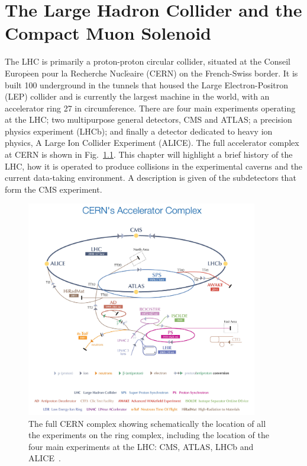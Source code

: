 \chapter{The Large Hadron Collider and the Compact Muon Solenoid}
\label{ch:LHCCMS}

The LHC is primarily a proton-proton circular collider, situated at the Conseil Europ$\acute{\text{e}}$en pour la Recherche Nucl$\acute{\text{e}}$aire (CERN) on the French-Swiss border. 
It is built 100\m{} underground in the tunnels that housed the Large Electron-Positron (LEP) collider and is currently the largest machine in the world, with an accelerator ring 27\km{} in circumference. 
There are four main experiments operating at the LHC; two multipurpose general detectors, CMS and ATLAS; a precision \bquark{} physics experiment (LHCb); and finally a detector dedicated to heavy ion physics, A Large Ion Collider Experiment (ALICE). 
The full accelerator complex at CERN is shown in Fig.~\ref{fig:CERNcomplex}.
This chapter will highlight a brief history of the LHC, how it is operated to produce collisions in the experimental caverns and the current data-taking environment.
A description is given of the subdetectors that form the CMS experiment.
\begin{figure}[htpb]
	\centering
	\includegraphics[width=0.9\textwidth]{Figures/CERNcomplex}
	\caption[The full CERN complex showing schematically the location of all the experiments on the ring complex, including the location of the four main experiments at the LHC: CMS, ATLAS, LHCb and ALICE.]{The full CERN complex showing schematically the location of all the experiments on the ring complex, including the location of the four main experiments at the LHC: CMS, ATLAS, LHCb and ALICE~\cite{CERNcomplex}. }
	\label{fig:CERNcomplex}
\end{figure}

